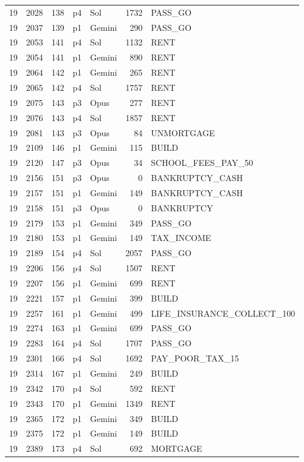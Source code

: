 \begin{longtable}{r r r l l r L{2.2in}}
19 & 2028 & 138 & p4 & Sol & 1732 & PASS\_GO \\
19 & 2037 & 139 & p1 & Gemini & 290 & PASS\_GO \\
19 & 2053 & 141 & p4 & Sol & 1132 & RENT \\
19 & 2054 & 141 & p1 & Gemini & 890 & RENT \\
19 & 2064 & 142 & p1 & Gemini & 265 & RENT \\
19 & 2065 & 142 & p4 & Sol & 1757 & RENT \\
19 & 2075 & 143 & p3 & Opus & 277 & RENT \\
19 & 2076 & 143 & p4 & Sol & 1857 & RENT \\
19 & 2081 & 143 & p3 & Opus & 84 & UNMORTGAGE \\
19 & 2109 & 146 & p1 & Gemini & 115 & BUILD \\
19 & 2120 & 147 & p3 & Opus & 34 & SCHOOL\_FEES\_PAY\_50 \\
19 & 2156 & 151 & p3 & Opus & 0 & BANKRUPTCY\_CASH \\
19 & 2157 & 151 & p1 & Gemini & 149 & BANKRUPTCY\_CASH \\
19 & 2158 & 151 & p3 & Opus & 0 & BANKRUPTCY \\
19 & 2179 & 153 & p1 & Gemini & 349 & PASS\_GO \\
19 & 2180 & 153 & p1 & Gemini & 149 & TAX\_INCOME \\
19 & 2189 & 154 & p4 & Sol & 2057 & PASS\_GO \\
19 & 2206 & 156 & p4 & Sol & 1507 & RENT \\
19 & 2207 & 156 & p1 & Gemini & 699 & RENT \\
19 & 2221 & 157 & p1 & Gemini & 399 & BUILD \\
19 & 2257 & 161 & p1 & Gemini & 499 & LIFE\_INSURANCE\_COLLECT\_100 \\
19 & 2274 & 163 & p1 & Gemini & 699 & PASS\_GO \\
19 & 2283 & 164 & p4 & Sol & 1707 & PASS\_GO \\
19 & 2301 & 166 & p4 & Sol & 1692 & PAY\_POOR\_TAX\_15 \\
19 & 2314 & 167 & p1 & Gemini & 249 & BUILD \\
19 & 2342 & 170 & p4 & Sol & 592 & RENT \\
19 & 2343 & 170 & p1 & Gemini & 1349 & RENT \\
19 & 2365 & 172 & p1 & Gemini & 349 & BUILD \\
19 & 2375 & 172 & p1 & Gemini & 149 & BUILD \\
19 & 2389 & 173 & p4 & Sol & 692 & MORTGAGE \\

\end{longtable}
